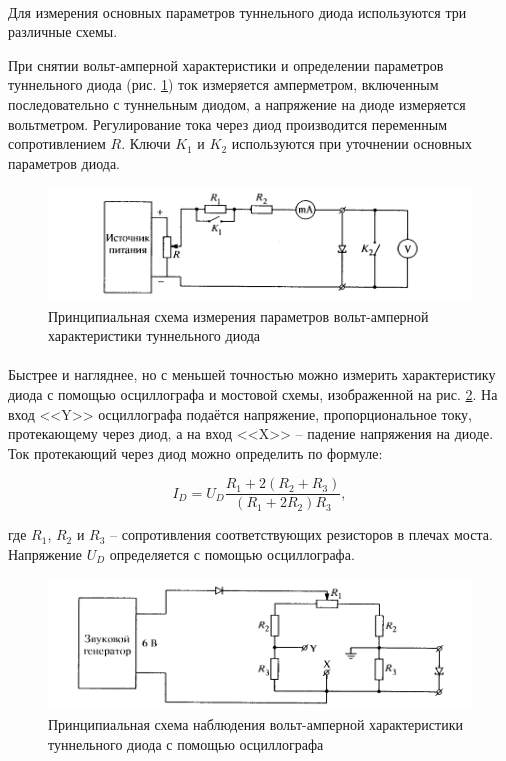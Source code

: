 \documentclass[a4paper,12pt]{article}
\begin{document}
\paragraph{}
	Для измерения основных параметров туннельного диода используются три различные схемы.
	
	При снятии вольт-амперной характеристики и определении параметров туннельного диода (рис. \ref{fig:setup_vac}) ток измеряется амперметром, включенным последовательно с туннельным диодом, а напряжение на диоде измеряется вольтметром. Регулирование тока через диод производится переменным сопротивлением $R$. Ключи $K_1$ и $K_2$ используются при уточнении основных параметров диода.

\begin{figure}[h]
\centering
\includegraphics[width=\textwidth]{setup_vac.png}
\caption{Принципиальная схема измерения параметров вольт-амперной характеристики туннельного диода}
\label{fig:setup_vac}
\end{figure}
\paragraph{}
	Быстрее и нагляднее, но с меньшей точностью можно измерить характеристику диода с помощью осциллографа и мостовой схемы, изображенной на рис. \ref{fig:setup_osc}. На вход <<Y>> осциллографа подаётся напряжение, пропорциональное току, протекающему через диод, а на вход  <<X>>  -- падение напряжения на диоде. Ток протекающий через диод можно определить по формуле:
	
	\begin{equation}
	I_D = U_D \frac{R_1 + 2(R_2 + R_3)}{(R_1 + 2 R_2)R_3},
	\label{e:res}
	\end{equation}
	
	\noindent где $R_1$, $R_2$ и $R_3$ -- сопротивления соответствующих резисторов в плечах моста. Напряжение $U_D$ определяется с помощью осциллографа. 

\begin{figure}[h]
\centering
\includegraphics[width=\textwidth]{setup_osc.png}
\caption{Принципиальная схема наблюдения вольт-амперной характеристики туннельного диода с помощью осциллографа}
\label{fig:setup_osc}
\end{figure}
\end{document}
